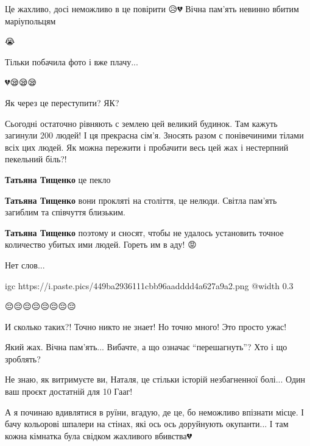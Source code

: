 \begin{itemize}

Це жахливо, досі неможливо в це повірити 😥💔 Вічна пам'ять невинно вбитим маріупольцям 🙏😢💔

😭

Тільки побачила фото і вже плачу...

💔😪😪😪

Як через це переступити? ЯК?


Сьогодні остаточно рівняють с землею цей великий будинок. Там кажуть загинули
200 людей! І ця прекрасна сім'я. Зносять разом с понівечиними тілами всіх цих
людей. Як можна пережити і пробачити весь цей жах і нестерпний пекельний біль?!

\begin{itemize} %
\textbf{Татьяна Тищенко} це пекло

\textbf{Татьяна Тищенко} вони прокляті на століття, це нелюди. Світла пам'ять загиблим та співчуття близьким.

\textbf{Татьяна Тищенко} поэтому и сносят, чтобы не удалось установить точное количество убитых ими людей. Гореть им в аду! 😡
\end{itemize} %


Нет слов...

\ifcmt
  igc https://i.paste.pics/449ba2936111cbb96aadddd4a627a9a2.png
	@width 0.3
\fi


😔😔😔😔😔😔😔😔


И сколько таких?! Точно никто не знает! Но точно много! Это просто ужас!


Який жах. Вічна пам'ять... Вибачте, а що означає \enquote{перешагнуть}? Хто і що зроблять?


Не знаю, як витримуєте ви, Наталя, це стільки історій незбагненної болі... Один
ваш проєкт достатній для 10 Гааг!

А я починаю вдивлятися в руїни, вгадую, де це, бо неможливо впізнати місце. І
бачу кольорові шпалери на стінах, які ось ось доруйнують окупанти... І там
кожна кімнатка була свідком жахливого вбивства💔


\end{itemize}
